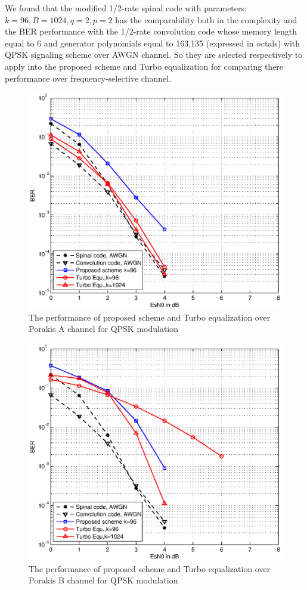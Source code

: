 \documentclass[conference]{IEEEtran}
\begin{document}
We found that the modified 1/2-rate spinal code with parameters: $k=96, B=1024, q=2, p=2$ has the comparability both in the complexity and the BER performance with the 1/2-rate convolution code whose memory length equal to 6 and generator polynomials equal to 163,135 (expressed in octals) with QPSK signaling scheme over AWGN channel. So they are selected respectively to apply into the proposed scheme and Turbo equalization for comparing there performance over frequency-selective channel.  
\begin{figure}[!t]
\centering
\includegraphics[width=3 in]{ChAQPSKComparison.eps}
\caption{The performance of proposed scheme and Turbo equalization over Porakis A channel for QPSK modulation}
\label{fig_ChAQPSKComparison}
\end{figure}

\begin{figure}[!t]
\centering
\includegraphics[width=3 in]{ChBQPSKComparison.eps}
\caption{The performance of proposed scheme and Turbo equalization over Porakis B channel for QPSK modulation}
\label{fig_ChBQPSKComparison}
\end{figure}
\end{document}
